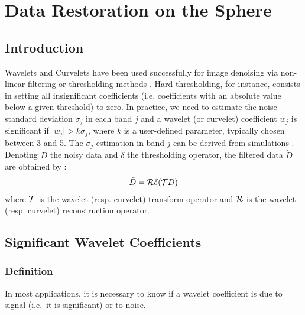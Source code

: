 
\chapter{Data Restoration on the Sphere}
\label{ch_restore}

\label{sect_exp}
\section{Introduction}

Wavelets and Curvelets have been used successfully for image denoising via non-linear filtering or 
thresholding methods \citep{starck:book06,starck:book10}. Hard thresholding, for instance, consists in 
setting all insignificant coefficients (i.e. coefficients with an absolute value below a given 
threshold) to zero. In practice, we need to estimate the noise standard deviation $\sigma_j$ in each band 
$j$ and a wavelet (or curvelet) coefficient $w_j$ is significant if $\mid w_j \mid > k \sigma_j$, where $k$ 
is a user-defined parameter, typically chosen between 3 and 5. The $\sigma_j$ estimation in band $j$ can be 
derived from simulations \citep{starck:book06}. Denoting $D$ the noisy data and $\delta$ the thresholding 
operator, the filtered data $\tilde D$ are obtained by : 
\begin{eqnarray}
 {\tilde D} =    {\cal R} \delta( {\cal T} D)
\end{eqnarray}
where ${\cal T}$ is the wavelet (resp. curvelet) transform operator and ${\cal R}$ is the wavelet (resp. curvelet) reconstruction operator. 

\section{Significant Wavelet Coefficients}
\label{ch_noise}
\subsection{Definition}

In most applications, it is necessary to know if a wavelet coefficient is due to signal (i.e.\ it is significant) or to noise. 

